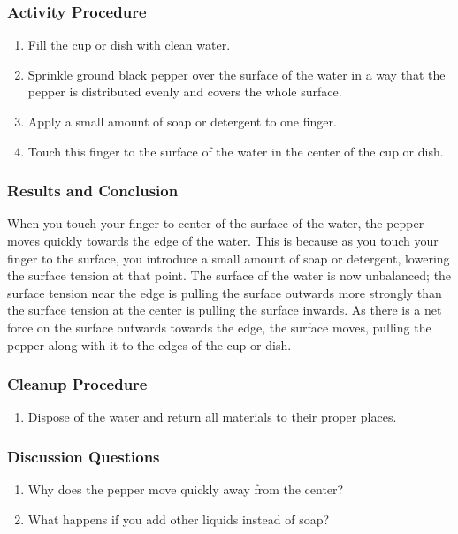 \subsubsection*{Activity Procedure}
\begin{enumerate}
\item{Fill the cup or dish with clean water.}
\item{Sprinkle ground black pepper over the surface of the water in a way that the pepper is distributed evenly and covers the whole surface.}
\item{Apply a small amount of soap or detergent to one finger.}
\item{Touch this finger to the surface of the water in the center of the cup or dish.}
\end{enumerate}
\subsubsection*{Results and Conclusion}
When you touch your finger to center of the surface of the water, the pepper moves quickly towards the edge of the water.  This is because as you touch your finger to the surface, you introduce a small amount of soap or detergent, lowering the surface tension at that point.  The surface of the water is now unbalanced; the surface tension near the edge is pulling the surface outwards more strongly than the surface tension at the center is pulling the surface inwards. As there is a net force on the surface outwards towards the edge, the surface moves, pulling the pepper along with it to the edges of the cup or dish.

\subsubsection*{Cleanup Procedure}
\begin{enumerate}
\item{Dispose of the water and return all materials to their proper places.}
\end{enumerate}

\subsubsection*{Discussion Questions}
\begin{enumerate}
\item{Why does the pepper move quickly away from the center?}
\item{What happens if you add other liquids instead of soap?}
\end{enumerate}

